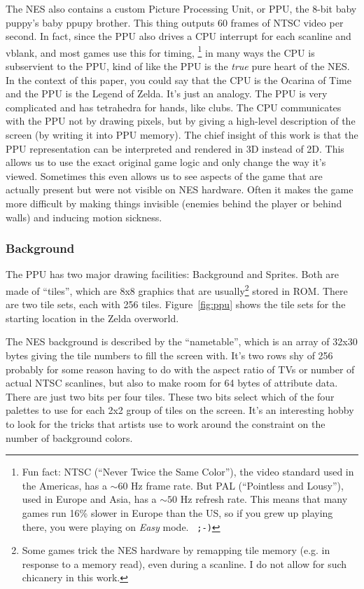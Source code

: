 \documentclass[twocolumn]{article}
\begin{document}
The NES also contains a custom Picture Processing Unit, or PPU, the
8-bit baby puppy's baby ppupy brother. This thing outputs 60 frames of
NTSC video per second. In fact, since the PPU also drives a CPU
interrupt for each scanline and vblank, and most games use
this for timing,%
%
\footnote{Fun fact: NTSC (``Never Twice the Same Color''), the video
  standard used in the Americas, has a $\sim 60$ Hz frame rate. But
  PAL (``Pointless and Lousy''), used in Europe and Asia, has a $\sim
  50$ Hz refresh rate. This means that many games run 16\% slower in
  Europe than the US, so if you grew up playing there, you were
  playing on {\em Easy} mode. {\tt\ ;-)}}
%
in many ways the CPU is subservient to the PPU, kind of like the PPU
is the {\it true} pure heart of the NES. In the context of this paper, you
could say that the CPU is the Ocarina of Time and the PPU is the
Legend of Zelda. It's just an analogy. The PPU is very complicated and
has tetrahedra for hands, like clubs. The CPU communicates with
the PPU not by drawing pixels, but by giving a high-level description
of the screen (by writing it into PPU memory). The chief insight of
this work is that the PPU representation can be interpreted and
rendered in 3D instead of 2D. This allows us to use the exact original
game logic and only change the way it's viewed. Sometimes this even
allows us to see aspects of the game that are actually present but
were not visible on NES hardware. Often it makes the game more
difficult by making things invisible (enemies behind the player or
behind walls) and inducing motion sickness.

\subsubsection{Background}
The PPU has two major drawing facilities: Background and Sprites. Both
are made of ``tiles'', which are 8x8 graphics that are
usually\footnote{Some games trick the NES hardware by remapping tile
memory (e.g. in response to a memory read), even during a scanline. I
do not allow for such chicanery in this work.} stored in ROM. There
are two tile sets, each with 256 tiles. Figure~\ref{fig:ppu} shows the
tile sets for the starting location in the Zelda overworld.

The NES background is described by the ``nametable'', which is an
array of 32x30 bytes giving the tile numbers to fill the screen with.
It's two rows shy of 256 probably for some reason having to do with
the aspect ratio of TVs or number of actual NTSC scanlines, but also
to make room for 64 bytes of attribute data. There are just two bits
per four tiles. These two bits select which of the four palettes to
use for each 2x2 group of tiles on the screen. It's an interesting hobby to
look for the tricks that artists use to work around the constraint on
the number of background colors. %
\end{document}
